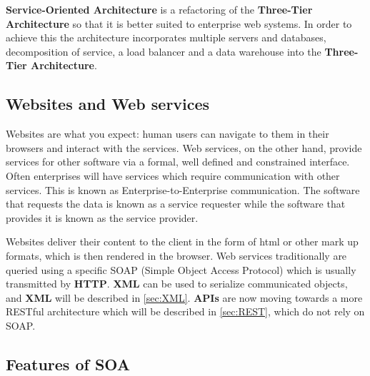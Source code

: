 \documentclass[11pt]{article}
\begin{document}
\textbf{Service-Oriented Architecture} is a refactoring of the \textbf{Three-Tier Architecture} so that it is better suited to enterprise web systems. In order to achieve this the architecture incorporates multiple servers and databases, decomposition of service, a load balancer and a data warehouse into the \textbf{Three-Tier Architecture}.

\subsection{Websites and Web services}

Websites are what you expect: human users can navigate to them in their browsers and interact with the services. Web services, on the other hand, provide services for other software via a formal, well defined and constrained interface. Often enterprises will have services which require communication with other services. This is known as Enterprise-to-Enterprise communication. The software that requests the data is known as a service requester while the software that provides it is known as the service provider.

Websites deliver their content to the client in the form of html or other mark up formats, which is then rendered in the browser. Web services traditionally are queried using a specific SOAP (Simple Object Access Protocol) which is usually transmitted by \textbf{HTTP}. \textbf{XML }can be used to serialize communicated objects, and \textbf{XML} will be described in \ref{sec:XML}. \textbf{APIs} are now moving towards a more RESTful architecture which will be described in \ref{sec:REST}, which do not rely on SOAP.

\subsection{Features of SOA}
\end{document}
